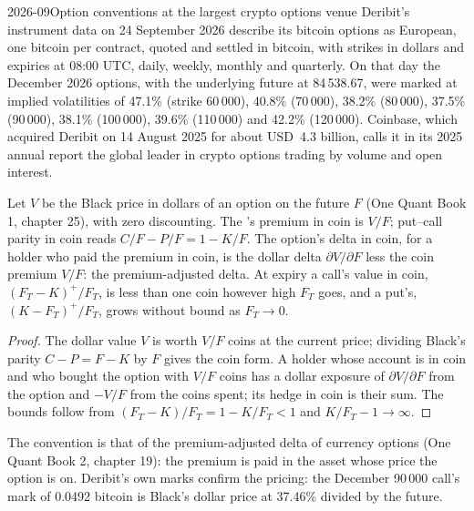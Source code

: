 \begin{dated}{2026-09}{Option conventions at the largest crypto options venue}\label{dat:m3:dated-futures-options-and-etfs:deribit}
Deribit's instrument data on 24 September 2026 describe its bitcoin options as European, one bitcoin per contract,
quoted and settled in bitcoin, with strikes in dollars and expiries at 08:00 UTC, daily, weekly, monthly and quarterly. On
that day the December 2026 options, with the underlying future at 84\,538.67, were marked at implied volatilities of
47.1\% (strike 60\,000), 40.8\% (70\,000), 38.2\% (80\,000), 37.5\% (90\,000), 38.1\% (100\,000), 39.6\% (110\,000) and
42.2\% (120\,000). Coinbase, which acquired Deribit on 14 August 2025 for about USD~4.3 billion, calls it in its 2025
annual report the global leader in crypto options trading by volume and open interest.
\end{dated}

\begin{proposition}\label{prop:m3:dated-futures-options-and-etfs:inverse}
Let $V$ be the Black price in dollars of an option on the future $F$ (One Quant Book 1, chapter 25), with zero discounting.
The 's premium in coin is $V/F$; put--call parity in coin reads $C/F - P/F = 1 - K/F$. The option's delta in
coin, for a holder who paid the premium in coin, is the dollar delta $\partial V/\partial F$ less the coin premium $V/F$: the
premium-adjusted delta. At expiry a call's value in coin, $(F_T - K)^+/F_T$, is less than one coin however high
$F_T$ goes, and a put's, $(K - F_T)^+/F_T$, grows without bound as $F_T \to 0$.
\end{proposition}

\begin{proof}
The dollar value $V$ is worth $V/F$ coins at the current price; dividing Black's parity $C - P = F - K$ by $F$ gives the
coin form. A holder whose account is in coin and who bought the option with $V/F$ coins has a dollar exposure of
$\partial V/\partial F$ from the option and $-V/F$ from the coins spent; its hedge in coin is their sum. The bounds follow
from $(F_T - K)/F_T = 1 - K/F_T < 1$ and $K/F_T - 1 \to \infty$.
\end{proof}

The convention is that of the premium-adjusted delta of currency options (One Quant Book 2, chapter 19): the premium is paid in the
asset whose price the option is on. Deribit's own marks confirm the pricing: the December 90\,000 call's mark of 0.0492 bitcoin
is Black's dollar price at 37.46\% divided by the future.

